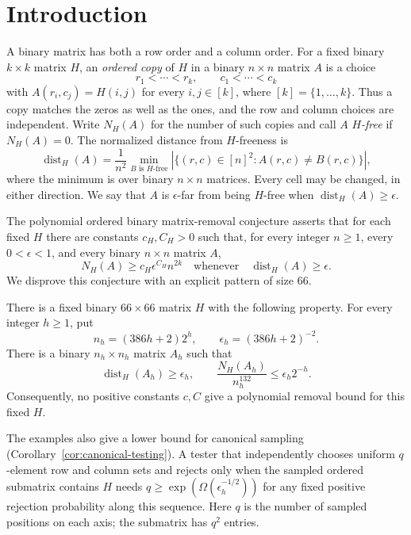 \section{Introduction}
\label{sec:introduction}

A binary matrix has both a row order and a column order. For a fixed
binary $k\times k$ matrix $H$, an \emph{ordered copy} of $H$ in a binary
$n\times n$ matrix $A$ is a choice
\[
 r_1<\cdots<r_k,\qquad c_1<\cdots<c_k
\]
with $A(r_i,c_j)=H(i,j)$ for every $i,j\in[k]$, where
$[k]=\{1,\ldots,k\}$. Thus a copy matches the zeros as well as the ones,
and the row and column choices are independent. Write $N_H(A)$ for the
number of such copies and call $A$ \emph{$H$-free} if $N_H(A)=0$.
The normalized distance from $H$-freeness is
\[
 \operatorname{dist}_H(A)
 =\frac1{n^2}\min_{B\text{ is }H\text{-free}}
   |\{(r,c)\in[n]^2:A(r,c)\ne B(r,c)\}|,
\]
where the minimum is over binary $n\times n$ matrices. Every cell may be
changed, in either direction. We say that $A$ is $\epsilon$-far from
being $H$-free when $\operatorname{dist}_H(A)\ge\epsilon$.

The polynomial ordered binary matrix-removal conjecture asserts that
for each fixed $H$ there are constants $c_H,C_H>0$ such that, for every
integer $n\ge1$, every $0<\epsilon<1$, and every binary $n\times n$ matrix $A$,
\[
 N_H(A)\ge c_H\epsilon^{C_H}n^{2k}
 \quad\text{whenever}\quad \operatorname{dist}_H(A)\ge\epsilon.
\]
We disprove this conjecture with an explicit pattern of size $66$.

\begin{theorem}\label{thm:main}
There is a fixed binary $66\times66$ matrix $H$ with the following
property. For every integer $h\ge1$, put
\[
 n_h=(386h+2)2^h,\qquad \epsilon_h=(386h+2)^{-2}.
\]
There is a binary $n_h\times n_h$ matrix $A_h$ such that
\[
 \operatorname{dist}_H(A_h)\ge\epsilon_h,
 \qquad
 \frac{N_H(A_h)}{n_h^{132}}\le\epsilon_h2^{-h}.
\]
Consequently, no positive constants $c,C$ give a polynomial removal
bound for this fixed $H$.
\end{theorem}

The examples also give a lower bound for canonical sampling
(Corollary~\ref{cor:canonical-testing}). A tester that independently
chooses uniform $q$-element row and column sets and rejects only when
the sampled ordered submatrix contains $H$ needs
$q\ge\exp(\Omega(\epsilon_h^{-1/2}))$ for any fixed positive rejection
probability along this sequence. Here $q$ is the number of sampled
positions on each axis; the submatrix has $q^2$ entries.

